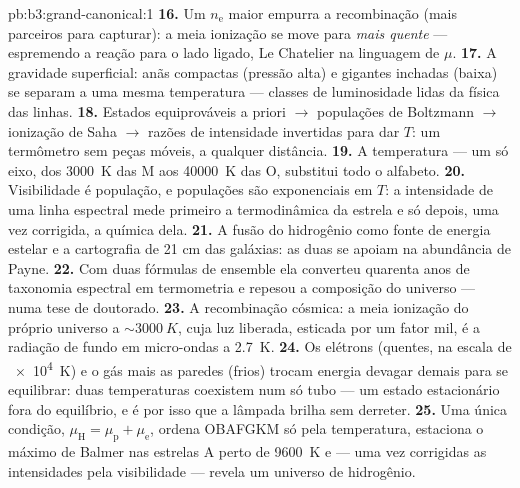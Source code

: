 \begin{solution}{pb:b3:grand-canonical:1}
\textbf{16.} Um $n_{\text{e}}$ maior empurra a recombinação (mais
parceiros para capturar): a meia ionização se move para \emph{mais
quente} --- espremendo a reação para o lado ligado, Le Chatelier na
linguagem de $\mu$.
\textbf{17.} A gravidade superficial: anãs compactas (pressão alta) e
gigantes inchadas (baixa) se separam a uma mesma temperatura --- classes
de luminosidade lidas da física das linhas.
\textbf{18.} Estados equiprováveis a priori $\to$ populações de
Boltzmann $\to$ ionização de Saha $\to$ razões de intensidade
invertidas para dar $T$: um termômetro sem peças móveis, a qualquer distância.
\textbf{19.} A temperatura --- um só eixo, dos \qty{3000}{K} das M aos
\qty{40000}{K} das O, substitui todo o alfabeto.
\textbf{20.} Visibilidade é população, e populações são
exponenciais em $T$: a intensidade de uma linha espectral mede primeiro
a termodinâmica da estrela e só depois, uma vez corrigida, a química
dela.
\textbf{21.} A fusão do hidrogênio como fonte de energia estelar e
a cartografia de 21 cm das galáxias: as duas se apoiam na
abundância de Payne.
\textbf{22.} Com duas fórmulas de ensemble ela converteu quarenta anos
de taxonomia espectral em termometria e repesou a
composição do universo --- numa tese de doutorado.
\textbf{23.} A recombinação cósmica: a meia ionização do próprio
universo a $\sim\qty{3000}{K}$, cuja luz liberada,
esticada por um fator mil, é a radiação de fundo em micro-ondas a
\qty{2.7}{K}.
\textbf{24.} Os elétrons (quentes, na escala de \qty{e4}{K}) e o gás
mais as paredes (frios) trocam energia devagar demais para se
equilibrar: duas temperaturas coexistem num só tubo --- um estado
estacionário fora do equilíbrio, e é por isso que a lâmpada brilha sem
derreter.
\textbf{25.} Uma única condição, $\mu_{\text{H}} = \mu_{\text{p}} +
\mu_{\text{e}}$, ordena OBAFGKM só pela temperatura, estaciona o
máximo de Balmer nas estrelas A perto de \qty{9600}{K} e --- uma vez
corrigidas as intensidades pela visibilidade --- revela um universo de
hidrogênio.
\end{solution}
